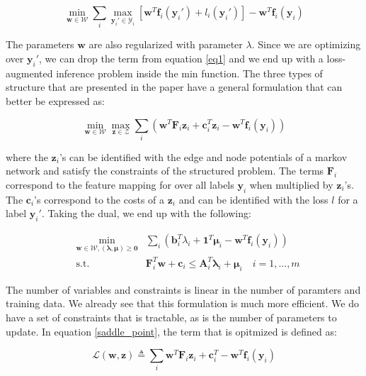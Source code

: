 \documentclass{article}
\renewcommand{\vec}{\mathbf}
\begin{document}
\begin{equation}
  \min_{\vec w \in \mathcal{W}} \sum_i \max_{\vec y_i' \in \mathcal{Y}_i} \left[
\vec w^T \vec f_i(\vec y_i') + l_i(\vec y_i') \right] - \vec w^T \vec f_i(\vec
y_i)
\end{equation}

The parameters $\vec w$ are also regularized with parameter $\lambda$. Since we are
optimizing over $\vec y_i'$, we can drop the term from equation \ref{eq1} and we end
up with a loss-augmented inference problem inside the min function. The three
types of structure that are presented in the paper have a general formulation
that can better be expressed as:

\begin{equation}
  \min_{\vec w \in \mathcal{W}} \max_{\vec z \in \mathcal{Z}} \sum_i \left( \vec
w^T \vec F_i \vec z_i + \vec c_i^T \vec z_i - \vec w^T \vec f_i(\vec y_i)
\right)
  \label{saddle_point}
\end{equation}

where the $\vec z_i$'s can be identified with the edge and node potentials of a
markov network and satisfy the constraints of the structured problem. The terms
$\vec F_i$ correspond to the feature mapping for over all labels $\vec y_i$ when
multiplied by $\vec z_i$'s. The $\vec c_i$'s correspond to the costs of a $\vec z_i$ and can be
identified with the loss $l$ for a label $\vec y_i'$. Taking the dual, we end up with
the following:

\begin{equation}
  \begin{aligned}
    &\min_{\vec w \in \mathcal{W}, (\vec \lambda,\vec \mu) \geq \vec 0} &\sum_i
\left( \vec b_i^T \lambda_i + \mathbf{1}^T \vec \mu_i - \vec w^T \vec f_i(\vec
y_i) \right)\\ &\text{s.t.} &\vec F_i^T \vec w + \vec c_i \leq \vec A_i^T \vec
\lambda_i + \vec \mu_i \quad i=1,\dots,m
  \end{aligned}
\end{equation}

The number of variables and constraints is linear in the number of paramters and
training data. We already see that this formulation is much more efficient. We
do have a set of constraints that is tractable, as is the number of parameters
to update. In equation \ref{saddle_point}, the term that is opitmized is defined
as:

\begin{equation}
  \mathcal{L}(\vec w,\vec z) \triangleq \sum_i \vec w^T \vec F_i \vec z_i + \vec
c_i^T - \vec w^T \vec f_i(\vec y_i)
  \label{saddle_obj}
\end{equation}
\end{document}
